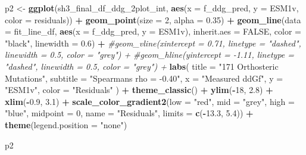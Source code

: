 \documentclass[
]{article}
\newenvironment{Shaded}{\begin{snugshade}}{\end{snugshade}}
\newcommand{\AttributeTok}[1]{\textcolor[rgb]{0.13,0.29,0.53}{#1}}
\newcommand{\CommentTok}[1]{\textcolor[rgb]{0.56,0.35,0.01}{\textit{#1}}}
\newcommand{\ConstantTok}[1]{\textcolor[rgb]{0.56,0.35,0.01}{#1}}
\newcommand{\DecValTok}[1]{\textcolor[rgb]{0.00,0.00,0.81}{#1}}
\newcommand{\FloatTok}[1]{\textcolor[rgb]{0.00,0.00,0.81}{#1}}
\newcommand{\FunctionTok}[1]{\textcolor[rgb]{0.13,0.29,0.53}{\textbf{#1}}}
\newcommand{\NormalTok}[1]{#1}
\newcommand{\OtherTok}[1]{\textcolor[rgb]{0.56,0.35,0.01}{#1}}
\newcommand{\SpecialCharTok}[1]{\textcolor[rgb]{0.81,0.36,0.00}{\textbf{#1}}}
\newcommand{\StringTok}[1]{\textcolor[rgb]{0.31,0.60,0.02}{#1}}
\begin{document}
\begin{Shaded}
\begin{Highlighting}[]
\NormalTok{p2 }\OtherTok{\textless{}{-}} \FunctionTok{ggplot}\NormalTok{(sh3\_final\_df\_ddg\_2plot\_int, }\FunctionTok{aes}\NormalTok{(}\AttributeTok{x =}\NormalTok{ f\_ddg\_pred, }\AttributeTok{y =}\NormalTok{ ESM1v, }\AttributeTok{color =}\NormalTok{ residuals)) }\SpecialCharTok{+}
  \FunctionTok{geom\_point}\NormalTok{(}\AttributeTok{size =} \DecValTok{2}\NormalTok{, }\AttributeTok{alpha =} \FloatTok{0.35}\NormalTok{) }\SpecialCharTok{+}
  \FunctionTok{geom\_line}\NormalTok{(}\AttributeTok{data =}\NormalTok{ fit\_line\_df, }\FunctionTok{aes}\NormalTok{(}\AttributeTok{x =}\NormalTok{ f\_ddg\_pred, }\AttributeTok{y =}\NormalTok{ ESM1v),}
            \AttributeTok{inherit.aes =} \ConstantTok{FALSE}\NormalTok{, }\AttributeTok{color =} \StringTok{"black"}\NormalTok{, }\AttributeTok{linewidth =} \FloatTok{0.6}\NormalTok{) }\SpecialCharTok{+}
  \CommentTok{\#geom\_vline(xintercept = 0.71, linetype = "dashed", linewidth = 0.5, color = "grey") +}
  \CommentTok{\#geom\_hline(yintercept = {-}1.11, linetype = "dashed", linewidth = 0.5, color = "grey") +}
  \FunctionTok{labs}\NormalTok{(}
    \AttributeTok{title =} \StringTok{"171 Orthosteric Mutations"}\NormalTok{,}
    \AttributeTok{subtitle =} \StringTok{"Spearman\textquotesingle{}s rho = {-}0.40"}\NormalTok{,}
    \AttributeTok{x =} \StringTok{"Measured ddGf"}\NormalTok{,}
    \AttributeTok{y =} \StringTok{"ESM1v"}\NormalTok{,}
    \AttributeTok{color =} \StringTok{"Residuals"}
\NormalTok{  ) }\SpecialCharTok{+}
  \FunctionTok{theme\_classic}\NormalTok{() }\SpecialCharTok{+}
  \FunctionTok{ylim}\NormalTok{(}\SpecialCharTok{{-}}\DecValTok{18}\NormalTok{, }\FloatTok{2.8}\NormalTok{) }\SpecialCharTok{+} \FunctionTok{xlim}\NormalTok{(}\SpecialCharTok{{-}}\FloatTok{0.9}\NormalTok{, }\FloatTok{3.1}\NormalTok{) }\SpecialCharTok{+}
  \FunctionTok{scale\_color\_gradient2}\NormalTok{(}\AttributeTok{low =} \StringTok{"red"}\NormalTok{, }\AttributeTok{mid =} \StringTok{"grey"}\NormalTok{, }\AttributeTok{high =} \StringTok{"blue"}\NormalTok{, }\AttributeTok{midpoint =} \DecValTok{0}\NormalTok{, }\AttributeTok{name =} \StringTok{"Residuals"}\NormalTok{,}
                        \AttributeTok{limits =} \FunctionTok{c}\NormalTok{(}\SpecialCharTok{{-}}\FloatTok{13.3}\NormalTok{, }\FloatTok{5.4}\NormalTok{)) }\SpecialCharTok{+}
  \FunctionTok{theme}\NormalTok{(}\AttributeTok{legend.position =} \StringTok{"none"}\NormalTok{)}

\NormalTok{p2}
\end{Highlighting}
\end{Shaded}
\end{document}
